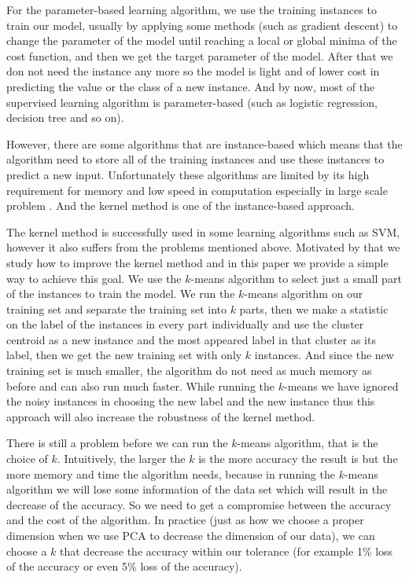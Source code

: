 \documentclass[runningheads,a4paper]{llncs}
\begin{document}
		For the parameter-based learning algorithm, we use the training instances to
		train our model, usually by applying some methods (such as gradient descent)
		to change the parameter of the model until reaching a local or global minima
		of the cost function, and then we get the target parameter of the model.
		After that we don not need the instance any more so the model is
		light and of lower cost in predicting the value or the class of a new instance. And
		by now, most of the supervised learning algorithm is parameter-based (such as
		logistic regression, decision tree and so on).

		However, there are some algorithms that are instance-based which means that
		the algorithm need to store all of the training instances and use these instances
		to predict a new input. Unfortunately these algorithms are limited by its high
		requirement for memory and low speed in computation especially in large scale
		problem \cite{jour3}. And the kernel method is one of the instance-based approach.

		The kernel method is successfully used in some learning algorithms such as SVM, 
		however it also suffers from the problems mentioned above.
		Motivated by that we study how to improve the kernel method and in this paper
		we provide a simple way to achieve this goal. We use the $k$-means algorithm to 
		select just a small part of the instances to train the model. We run the 
		$k$-means algorithm on our training
		set and separate the training set into $k$ parts, then we make a statistic on the
		label of the instances in every part individually and use the cluster centroid as a 
		new instance and the most appeared label in that cluster as its label, then
		we get the new training set with only $k$ instances.
		And since the new training set is much smaller, the algorithm do not need as much
		memory as before and can also run much faster. While running the $k$-means we
		have ignored the noisy instances in choosing the new label and the new instance
		thus this approach will also increase the robustness of the kernel method.

		There is still a problem before we can run the $k$-means algorithm, that is
		the choice of $k$. Intuitively, the larger the $k$ is the
		more accuracy the result is but the more memory and time the algorithm needs,
		because in running the $k$-means algorithm we will lose some information of the
		data set which will result in the decrease of the accuracy. So we need to get
		a compromise between the accuracy and the cost of the algorithm. In practice
		(just as how we choose a proper dimension when we use PCA to decrease the
		dimension of our data), we can choose a $k$ that decrease the accuracy within our
		tolerance (for example 1\% loss of the accuracy or even 5\% loss of the accuracy).
\end{document}
